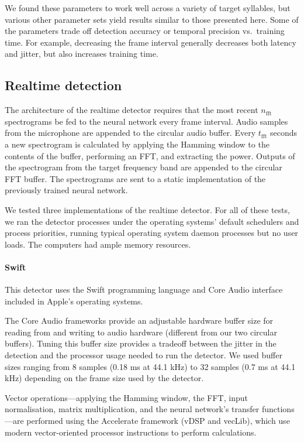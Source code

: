 \documentclass[10pt,letterpaper]{article}
\renewcommand{\subsubsection}[1]{\paragraph{#1}}
\begin{document}
We found these parameters to work well across a variety of target
syllables, but various other parameter sets yield results similar to
those presented here.  Some of the parameters trade off detection
accuracy or temporal precision vs.~training time. For example,
decreasing the frame interval generally decreases both latency and
jitter, but also increases training time.

\subsection{Realtime detection}

The architecture of the realtime detector requires that the most
recent $n_\textrm{fft}$ spectrograms be fed to the neural network
every frame interval.  Audio samples from the microphone are appended
to the circular audio buffer.  Every $t_\textrm{fft}$ seconds a new
spectrogram is calculated by applying the Hamming window to the
contents of the buffer, performing an FFT, and extracting the
power. Outputs of the spectrogram from the target frequency band are
appended to the circular FFT buffer.  The spectrograms are sent to a
static implementation of the previously trained neural network.

We tested three implementations of the realtime detector.  For all of
these tests, we ran the detector processes under the operating
systems' default schedulers and process priorities, running typical
operating system daemon processes but no user loads.  The computers
had ample memory resources.

\subsubsection{Swift}

This detector uses the Swift programming language and Core Audio
interface included in Apple's operating systems.

The Core Audio frameworks provide an adjustable hardware buffer size
for reading from and writing to audio hardware (different from our two
circular buffers). Tuning this buffer size provides a tradeoff between
the jitter in the detection and the processor usage needed to run the
detector. We used buffer sizes ranging from 8 samples (0.18 ms at 44.1
kHz) to 32 samples (0.7 ms at 44.1 kHz) depending on the frame size 
used by the detector.

Vector operations---applying the Hamming window, the FFT, input
normalisation, matrix multiplication, and the neural network's
transfer functions---are performed using the Accelerate framework
(vDSP and vecLib), which use modern vector-oriented processor
instructions to perform calculations.
\end{document}
